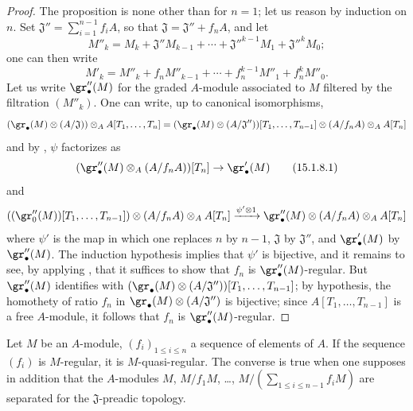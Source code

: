 \begin{proof}
The proposition is none other than  for $n=1$;
let us reason by induction on $n$.
Set $\mathfrak{J}''=\sum_{i=1}^{n-1}f_iA$, so that $\mathfrak{J}=\mathfrak{J}''+f_nA$, and let
\[
  M''_k = M_k+\mathfrak{J}''M_{k-1}+\cdots+\mathfrak{J}''^{k-1}M_1+\mathfrak{J}''^kM_0;
\]
one can then write
\[
  M'_k = M''_k + f_nM''_{k-1}+\cdots+f_n^{k-1}M''_1+f_n^kM''_0.
\]
Let us write $\gr''_\bullet(M)$ for the graded $A$-module associated to $M$ filtered by the filtration $(M''_k)$.
One can write, up to canonical isomorphisms,
\[
  (\gr_\bullet(M)\otimes(A/\mathfrak{J}))\otimes_A A[T_1,\ldots,T_n]
  = (\gr_\bullet(M)\otimes(A/\mathfrak{J}''))[T_1,\ldots,T_{n-1}]\otimes(A/f_nA)\otimes_A A[T_n]
\]
and by , $\psi$ factorizes as
\[
\label{0.15.1.8.1}
  (\gr''_\bullet(M)\otimes_A(A/f_nA))[T_n] \to \gr'_\bullet(M)
\tag{15.1.8.1}
\]
and
\[
  ((\gr''_0(M))[T_1,\ldots,T_{n-1}])\otimes(A/f_nA)\otimes_A A[T_n]
  \xrightarrow{\psi'\otimes 1} \gr''_\bullet(M)\otimes(A/f_nA)\otimes_A A[T_n]
\]
where $\psi'$ is the map  in which one replaces $n$ by $n-1$, $\mathfrak{J}$ by $\mathfrak{J}''$, and $\gr'_\bullet(M)$ by $\gr''_\bullet(M)$.
The induction hypothesis implies that $\psi'$ is bijective, and it remains to see, by applying , that it suffices to show that $f_n$ is $\gr''_\bullet(M)$-regular.
But $\gr''_\bullet(M)$ identifies with $(\gr_\bullet(M)\otimes(A/\mathfrak{J}''))[T_1,\ldots,T_{n-1}]$;
by hypothesis, the homothety of ratio $f_n$ in $\gr_\bullet(M)\otimes(A/\mathfrak{J}'')$ is bijective;
since $A[T_1,\ldots,T_{n-1}]$ is a free $A$-module, it follows that $f_n$ is $\gr''_\bullet(M)$-regular.
\end{proof}

\begin{proposition}[15.1.9]
\label{0.15.1.9}
Let $M$ be an $A$-module, $(f_i)_{1\leq i\leq n}$ a sequence of elements of $A$.
If the sequence $(f_i)$ is $M$-regular, it is $M$-quasi-regular.
The converse is true when one supposes in addition that the $A$-modules $M$, $M/f_1M$, \ldots, $M/(\sum_{1\leq i\leq n-1}f_iM)$ are separated for the $\mathfrak{J}$-preadic topology.
\end{proposition}

